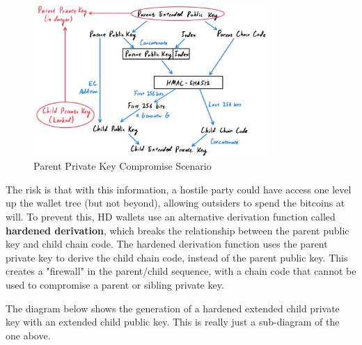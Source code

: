 \documentclass{article}
\begin{document}
    \begin{figure}[H]
    \centering
    \includegraphics[width=0.8\textwidth]{img/Parent_Private_Key_compromised.jpg}
    \caption{Parent Private Key Compromise Scenario}
    \end{figure}

    The risk is that with this information, a hostile party could have access one level up the wallet tree (but not beyond), allowing outsiders to spend the bitcoins at will. To prevent this, HD wallets use an alternative derivation function called \textbf{hardened derivation}, which breaks the relationship between the parent public key and child chain code. The hardened derivation function uses the parent private key to derive the child chain code, instead of the parent public key. This creates a "firewall" in the parent/child sequence, with a chain code that cannot be used to compromise a parent or sibling private key.

    The diagram below shows the generation of a hardened extended child private key with an extended child public key. This is really just a sub-diagram of the one above.
\end{document}
